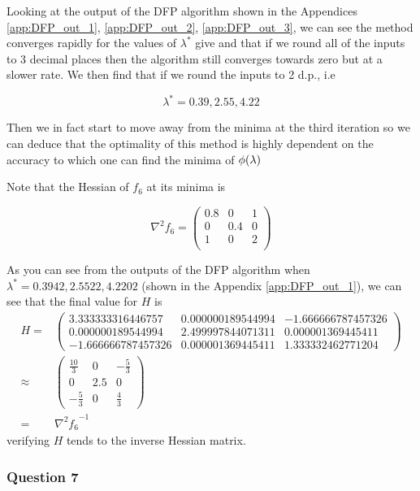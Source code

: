 \documentclass[11pt]{article} %
\let\originalleft\left
\let\originalright\right
\renewcommand{\left}{\mathopen{}\mathclose\bgroup\originalleft}
\renewcommand{\right}{\aftergroup\egroup\originalright}
\begin{document}
Looking at the output of the DFP algorithm shown in the Appendices \ref{app:DFP_out_1}, \ref{app:DFP_out_2}, \ref{app:DFP_out_3}, we can see the method converges rapidly for the values of $\lambda^*$ give and that if we round all of the inputs to 3 decimal places then the algorithm still converges towards zero but at a slower rate. We then find that if we round the inputs to 2 d.p., i.e

$$ \lambda^* = 0.39, 2.55, 4.22$$

Then we in fact start to move away from the minima at the third iteration so we can deduce that the optimality of this method is highly dependent on the accuracy to which one can find the minima of $\phi \left(\lambda\right)$

Note that the Hessian of $f_6$ at its minima is

\begin{equation*}
	\nabla^2 f_6 =
	\begin{pmatrix}
		0.8 & 0    & 1 \\
		0    & 0.4 & 0 \\
		1    & 0    & 2 \\
	\end{pmatrix}
\end{equation*}

As you can see from the outputs of the DFP algorithm when $\lambda^* = 0.3942, 2.5522, 4.2202$ (shown in the Appendix \ref{app:DFP_out_1}), we can see that the final value for $H$ is
\begin{align*}
	H = {} &
	\begin{pmatrix}
		 3.333333316446757 & 0.000000189544994 & -1.666666787457326\\
  		 0.000000189544994 & 2.499997844071311 & 0.000001369445411\\
  		-1.666666787457326 & 0.000001369445411 & 1.333332462771204 
	\end{pmatrix} \\
	  \approx{} & 
	  \begin{pmatrix}
		 \frac{10}{3} & 0 & -\frac{5}{3}\\
  		 0 & 2.5 & 0\\
  		-\frac{5}{3} & 0 & \frac{4}{3}
	\end{pmatrix} \\
	= {} & {\nabla^2 f_6}^{-1}
\end{align*}
verifying $H$ tends to the inverse Hessian matrix.

\subsubsection*{Question 7}
\end{document}

